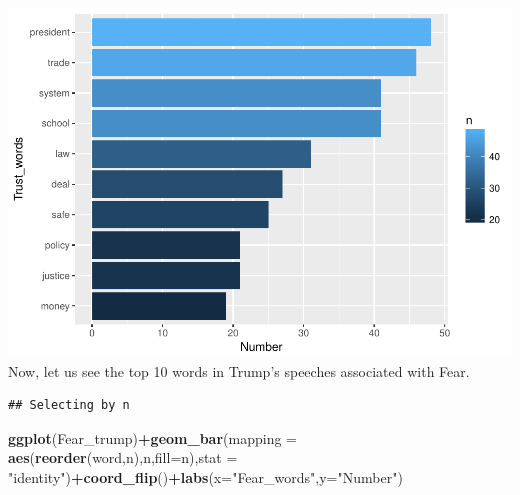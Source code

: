 \documentclass[]{article}
\newenvironment{Shaded}{\begin{snugshade}}{\end{snugshade}}
\newcommand{\KeywordTok}[1]{\textcolor[rgb]{0.13,0.29,0.53}{\textbf{#1}}}
\newcommand{\DataTypeTok}[1]{\textcolor[rgb]{0.13,0.29,0.53}{#1}}
\newcommand{\DecValTok}[1]{\textcolor[rgb]{0.00,0.00,0.81}{#1}}
\newcommand{\StringTok}[1]{\textcolor[rgb]{0.31,0.60,0.02}{#1}}
\newcommand{\OperatorTok}[1]{\textcolor[rgb]{0.81,0.36,0.00}{\textbf{#1}}}
\newcommand{\NormalTok}[1]{#1}
\begin{document}
\includegraphics{Donald_Trump_Speech_sentiment_analysis_files/figure-latex/unnamed-chunk-30-1.pdf}
Now, let us see the top 10 words in Trump's speeches associated with
Fear.

\begin{Shaded}
\end{Shaded}

\begin{verbatim}
## Selecting by n
\end{verbatim}

\begin{Shaded}
\begin{Highlighting}[]
\KeywordTok{ggplot}\NormalTok{(Fear_trump)}\OperatorTok{+}\KeywordTok{geom_bar}\NormalTok{(}\DataTypeTok{mapping =} \KeywordTok{aes}\NormalTok{(}\KeywordTok{reorder}\NormalTok{(word,n),n,}\DataTypeTok{fill=}\NormalTok{n),}\DataTypeTok{stat =} \StringTok{"identity"}\NormalTok{)}\OperatorTok{+}\KeywordTok{coord_flip}\NormalTok{()}\OperatorTok{+}\KeywordTok{labs}\NormalTok{(}\DataTypeTok{x=}\StringTok{"Fear_words"}\NormalTok{,}\DataTypeTok{y=}\StringTok{"Number"}\NormalTok{)}
\end{Highlighting}
\end{Shaded}
\end{document}
